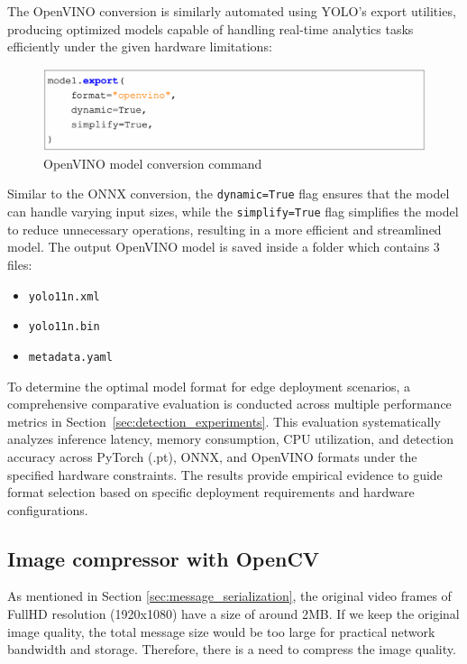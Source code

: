 The OpenVINO conversion is similarly automated using YOLO's export utilities, producing optimized models capable of handling real-time analytics tasks efficiently under the given hardware limitations:

\begin{figure}[htbp]
    \centering
    \includegraphics[width=1\textwidth]{Figure/openvino_command.png}
    \caption{OpenVINO model conversion command}
    \label{fig:openvino_command}
\end{figure}

Similar to the ONNX conversion, the \texttt{dynamic=True} flag ensures that the model can handle varying input sizes, while the \texttt{simplify=True} flag simplifies the model to reduce unnecessary operations, resulting in a more efficient and streamlined model. The output OpenVINO model is saved inside a folder which contains 3 files:
\begin{itemize}
    \item \texttt{yolo11n.xml}
    \item \texttt{yolo11n.bin}
    \item \texttt{metadata.yaml}
\end{itemize}


To determine the optimal model format for edge deployment scenarios, a comprehensive comparative evaluation is conducted across multiple performance metrics in Section~\ref{sec:detection_experiments}. This evaluation systematically analyzes inference latency, memory consumption, CPU utilization, and detection accuracy across PyTorch (.pt), ONNX, and OpenVINO formats under the specified hardware constraints. The results provide empirical evidence to guide format selection based on specific deployment requirements and hardware configurations.


\subsection{Image compressor with OpenCV}
\label{sec:edge_image_compression}

As mentioned in Section \ref{sec:message_serialization}, the original video frames of FullHD resolution (1920x1080) have a size of around 2MB. If we keep the original image quality, the total message size would be too large for practical network bandwidth and storage. Therefore, there is a need to compress the image quality.

